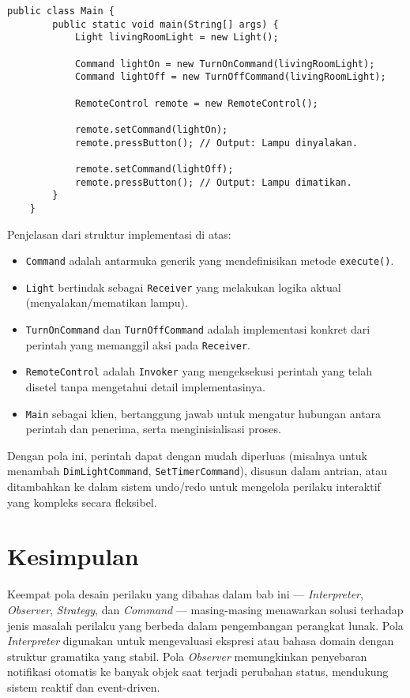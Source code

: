 \begin{lstlisting}[style=JavaStyle, caption={Client: Penggunaan Command}, label={lst:command-client}]
	public class Main {
		public static void main(String[] args) {
			Light livingRoomLight = new Light();
			
			Command lightOn = new TurnOnCommand(livingRoomLight);
			Command lightOff = new TurnOffCommand(livingRoomLight);
			
			RemoteControl remote = new RemoteControl();
			
			remote.setCommand(lightOn);
			remote.pressButton(); // Output: Lampu dinyalakan.
			
			remote.setCommand(lightOff);
			remote.pressButton(); // Output: Lampu dimatikan.
		}
	}
\end{lstlisting}

Penjelasan dari struktur implementasi di atas:
\begin{itemize}
	\item \texttt{Command} adalah antarmuka generik yang mendefinisikan metode \texttt{execute()}.
	\item \texttt{Light} bertindak sebagai \texttt{Receiver} yang melakukan logika aktual (menyalakan/mematikan lampu).
	\item \texttt{TurnOnCommand} dan \texttt{TurnOffCommand} adalah implementasi konkret dari perintah yang memanggil aksi pada \texttt{Receiver}.
	\item \texttt{RemoteControl} adalah \texttt{Invoker} yang mengeksekusi perintah yang telah disetel tanpa mengetahui detail implementasinya.
	\item \texttt{Main} sebagai klien, bertanggung jawab untuk mengatur hubungan antara perintah dan penerima, serta menginisialisasi proses.
\end{itemize}

Dengan pola ini, perintah dapat dengan mudah diperluas (misalnya untuk menambah \texttt{DimLightCommand}, \texttt{SetTimerCommand}), disusun dalam antrian, atau ditambahkan ke dalam sistem undo/redo untuk mengelola perilaku interaktif yang kompleks secara fleksibel.




\section{Kesimpulan}

Keempat pola desain perilaku yang dibahas dalam bab ini — \textit{Interpreter}, \textit{Observer}, \textit{Strategy}, dan \textit{Command} — masing-masing menawarkan solusi terhadap jenis masalah perilaku yang berbeda dalam pengembangan perangkat lunak. Pola \textit{Interpreter} digunakan untuk mengevaluasi ekspresi atau bahasa domain dengan struktur gramatika yang stabil. Pola \textit{Observer} memungkinkan penyebaran notifikasi otomatis ke banyak objek saat terjadi perubahan status, mendukung sistem reaktif dan event-driven.

